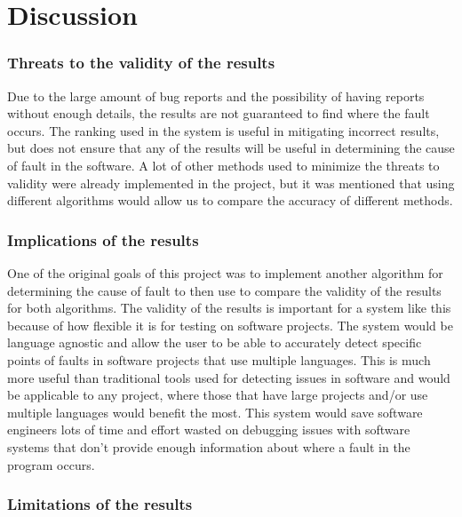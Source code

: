 \documentclass[12pt]{article}
\begin{document}
\hypertarget{discussion}{%
\section{Discussion}\label{discussion}}

\hypertarget{threats-to-the-validity-of-the-results}{%
\subsubsection{Threats to the validity of the
results}\label{threats-to-the-validity-of-the-results}}

Due to the large amount of bug reports and the possibility of having
reports without enough details, the results are not guaranteed to find
where the fault occurs. The ranking used in the system is useful in
mitigating incorrect results, but does not ensure that any of the
results will be useful in determining the cause of fault in the
software. A lot of other methods used to minimize the threats to
validity were already implemented in the project, but it was mentioned
that using different algorithms would allow us to compare the accuracy
of different methods.

\hypertarget{implications-of-the-results}{%
\subsubsection{Implications of the
results}\label{implications-of-the-results}}

One of the original goals of this project was to implement another
algorithm for determining the cause of fault to then use to compare the
validity of the results for both algorithms. The validity of the results
is important for a system like this because of how flexible it is for
testing on software projects. The system would be language agnostic and
allow the user to be able to accurately detect specific points of faults
in software projects that use multiple languages. This is much more
useful than traditional tools used for detecting issues in software and
would be applicable to any project, where those that have large projects
and/or use multiple languages would benefit the most. This system would
save software engineers lots of time and effort wasted on debugging
issues with software systems that don't provide enough information about
where a fault in the program occurs.

\hypertarget{limitations-of-the-results}{%
\subsubsection{Limitations of the
results}\label{limitations-of-the-results}}
\end{document}
